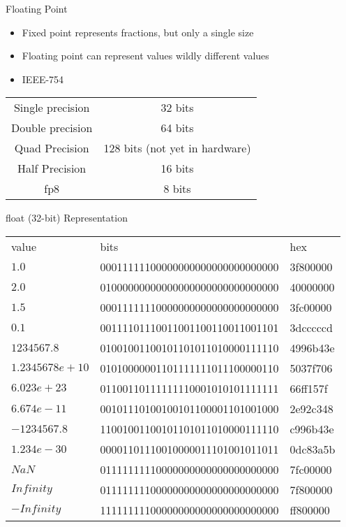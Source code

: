 \begin{withoutheadline}
\begin{frame}[fragile]{Floating Point}
\begin{itemize}
    \item Fixed point represents fractions, but only a single size
    \item Floating point can represent values wildly different values
    \item IEEE-754
\end{itemize}
\begin{tabular}{c|c}
Single precision & 32 bits \\
Double precision & 64 bits \\
Quad Precision   & 128 bits (not yet in hardware) \\
Half Precision   & 16 bits \\
fp8              & 8 bits  \\
\end{tabular}
\end{frame}

\begin{frame}[fragile]{float (32-bit) Representation}
\begin{tabular}{p{2cm}|p{10cm}|p{2cm}}
value           &                             bits & hex      \\
$1.0$           & 00011111100000000000000000000000 & 3f800000 \\
$2.0$           & 01000000000000000000000000000000 & 40000000 \\
$1.5$           & 00011111110000000000000000000000 & 3fc00000 \\
$0.1$           & 00111101110011001100110011001101 & 3dcccccd \\
$1234567.8$     & 01001001100101101011010000111110 & 4996b43e \\
$1.2345678e+10$ & 01010000001101111111011100000110 & 5037f706 \\
$6.023e+23$     & 01100110111111110001010101111111 & 66ff157f \\
$6.674e-11$     & 00101110100100101100001101001000 & 2e92c348 \\
$-1234567.8$    & 11001001100101101011010000111110 & c996b43e \\
$1.234e-30$     & 00001101110010000011101001011011 & 0dc83a5b \\
$NaN$           & 01111111110000000000000000000000 & 7fc00000 \\
$Infinity$      & 01111111100000000000000000000000 & 7f800000 \\
$-Infinity$     & 11111111100000000000000000000000 & ff800000 \\
\end{tabular}
\end{frame}


\end{withoutheadline}
